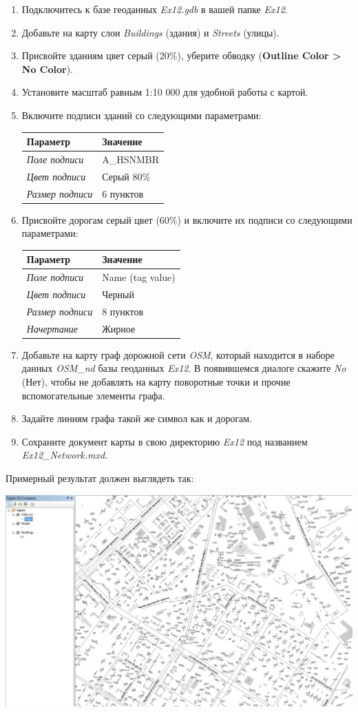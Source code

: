 \documentclass[12pt,]{book}
\begin{document}
\begin{enumerate}
\def\labelenumi{\arabic{enumi}.}
\item
  Подключитесь к базе геоданных \emph{Ex12.gdb} в вашей папке \emph{Ex12}.
\item
  Добавьте на карту слои \emph{Buildings} (здания) и \emph{Streets} (улицы).
\item
  Присвойте зданиям цвет серый (20\%), уберите обводку (\textbf{Outline Color \textgreater{} No Color}).
\item
  Установите масштаб равным 1:10 000 для удобной работы с картой.
\item
  Включите подписи зданий со следующими параметрами:

  \begin{longtable}[]{@{}ll@{}}
  \toprule
  Параметр & Значение\tabularnewline
  \midrule
  \endhead
  \emph{Поле подписи} & A\_HSNMBR\tabularnewline
  \emph{Цвет подписи} & Серый 80\%\tabularnewline
  \emph{Размер подписи} & 6 пунктов\tabularnewline
  \bottomrule
  \end{longtable}
\item
  Присвойте дорогам серый цвет (60\%) и включите их подписи со следующими параметрами:

  \begin{longtable}[]{@{}ll@{}}
  \toprule
  Параметр & Значение\tabularnewline
  \midrule
  \endhead
  \emph{Поле подписи} & Name (tag value)\tabularnewline
  \emph{Цвет подписи} & Черный\tabularnewline
  \emph{Размер подписи} & 8 пунктов\tabularnewline
  \emph{Начертание} & Жирное\tabularnewline
  \bottomrule
  \end{longtable}
\item
  Добавьте на карту граф дорожной сети \emph{OSM}, который находится в наборе данных \emph{OSM\_nd} базы геоданных \emph{Ex12}. В появившемся диалоге скажите \emph{No} (Нет), чтобы не добавлять на карту поворотные точки и прочие вспомогательные элементы графа.
\item
  Задайте линиям графа такой же символ как и дорогам.
\item
  Сохраните документ карты в свою директорию \emph{Ex12} под названием \emph{Ex12\_Network.mxd}.
\end{enumerate}

Примерный результат должен выглядеть так:

\includegraphics{images/Ex12/image6.png}
\end{document}
